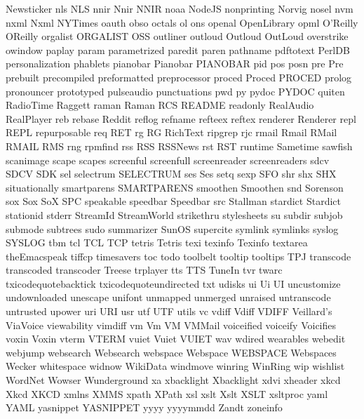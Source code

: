 Newsticker
nls
NLS
nnir
Nnir
NNIR
noaa
NodeJS
nonprinting
Norvig
nosel
nvm
nxml
Nxml
NYTimes
oauth
obso
octals
ol
ons
openal
OpenLibrary
opml
O'Reilly
OReilly
orgalist
ORGALIST
OSS
outliner
outloud
Outloud
OutLoud
overstrike
owindow
paplay
param
parametrized
paredit
paren
pathname
pdftotext
PerlDB
personalization
phablets
pianobar
Pianobar
PIANOBAR
pid
pos
posn
pre
Pre
prebuilt
precompiled
preformatted
preprocessor
proced
Proced
PROCED
prolog
pronouncer
prototyped
pulseaudio
punctuations
pwd
py
pydoc
PYDOC
quiten
RadioTime
Raggett
raman
Raman
RCS
README
readonly
RealAudio
RealPlayer
reb
rebase
Reddit
reflog
refname
refteex
reftex
renderer
Renderer
repl
REPL
repurposable
req
RET
rg
RG
RichText
ripgrep
rjc
rmail
Rmail
RMail
RMAIL
RMS
rng
rpmfind
rss
RSS
RSSNews
rst
RST
runtime
Sametime
sawfish
scanimage
scape
scapes
screenful
screenfull
screenreader
screenreaders
sdcv
SDCV
SDK
sel
selectrum
SELECTRUM
ses
Ses
setq
sexp
SFO
shr
shx
SHX
situationally
smartparens
SMARTPARENS
smoothen
Smoothen
snd
Sorenson
sox
Sox
SoX
SPC
speakable
speedbar
Speedbar
src
Stallman
stardict
Stardict
stationid
stderr
StreamId
StreamWorld
strikethru
stylesheets
su
subdir
subjob
submode
subtrees
sudo
summarizer
SunOS
supercite
symlink
symlinks
syslog
SYSLOG
tbm
tcl
TCL
TCP
tetris
Tetris
texi
texinfo
Texinfo
textarea
theEmacspeak
tiffcp
timesavers
toc
todo
toolbelt
tooltip
tooltips
TPJ
transcode
transcoded
transcoder
Treese
trplayer
tts
TTS
TuneIn
tvr
twarc
txicodequotebacktick
txicodequoteundirected
txt
udisks
ui
Ui
UI
uncustomize
undownloaded
unescape
unifont
unmapped
unmerged
unraised
untranscode
untrusted
upower
uri
URI
usr
utf
UTF
utils
vc
vdiff
Vdiff
VDIFF
Veillard's
ViaVoice
viewability
vimdiff
vm
Vm
VM
VMMail
voiceified
voiceify
Voicifies
voxin
Voxin
vterm
VTERM
vuiet
Vuiet
VUIET
wav
wdired
wearables
webedit
webjump
websearch
Websearch
webspace
Webspace
WEBSPACE
Webspaces
Wecker
whitespace
widnow
WikiData
windmove
winring
WinRing
wip
wishlist
WordNet
Wowser
Wunderground
xa
xbacklight
Xbacklight
xdvi
xheader
xkcd
Xkcd
XKCD
xmlns
XMMS
xpath
XPath
xsl
xslt
Xslt
XSLT
xsltproc
yaml
YAML
yasnippet
YASNIPPET
yyyy
yyyymmdd
Zandt
zoneinfo
